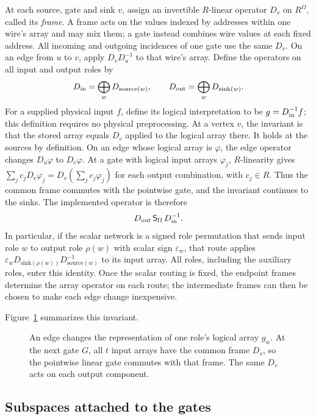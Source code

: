At each source, gate and sink $v$, assign an invertible $R$-linear operator
$D_v$ on $R^\Omega$, called its \emph{frame}.  A frame acts on the values
indexed by addresses within one wire's array and may mix them; a gate instead
combines wire values at each fixed address.  All incoming and outgoing
incidences of one gate use the same $D_v$.  On an edge from $u$ to $v$, apply
$D_vD_u^{-1}$ to that wire's array.  Define the operators on all input and
output roles by
\[
 D_{\rm in}=\bigoplus_w D_{\mathrm{source}(w)},\qquad
 D_{\rm out}=\bigoplus_w D_{\mathrm{sink}(w)}.
\]
For a supplied physical input $f$, define its logical interpretation to be
$g=D_{\rm in}^{-1}f$; this definition requires no physical preprocessing.
At a vertex $v$, the invariant is that the stored array equals $D_v$ applied
to the logical array there.  It holds at the sources by definition.  On an
edge whose logical array is $\varphi$, the edge operator changes $D_u\varphi$
to $D_v\varphi$.  At a gate with logical input arrays $\varphi_j$,
$R$-linearity gives
$\sum_j c_jD_v\varphi_j=D_v(\sum_j c_j\varphi_j)$ for each output combination, with
$c_j\in R$.  Thus the common frame commutes with the pointwise gate, and
the invariant continues to the sinks.  The implemented operator is therefore
\begin{equation}
 D_{\rm out}\,\mathsf S_\Omega\,D_{\rm in}^{-1}.
 \label{eq:common-frame-identity}
\end{equation}
In particular, if the scalar network is a signed role permutation that
sends input role $w$ to output role $\rho(w)$ with scalar sign
$\varepsilon_w$, that route applies
$\varepsilon_wD_{\mathrm{sink}(\rho(w))}
D_{\mathrm{source}(w)}^{-1}$ to its input array.  All roles, including
the auxiliary roles, enter this identity.  Once the scalar routing is fixed,
the endpoint frames determine the array operator on each route; the
intermediate frames can then be chosen to make each edge change inexpensive.

Figure~\ref{fig:frame-compatibility} summarizes this invariant.
\begin{figure}[ht]
\centering

\caption{An edge changes the representation of one role's logical array
$g_w$. At the next gate $G$, all $t$ input arrays have the common frame
$D_v$, so the pointwise linear gate commutes with that frame. The same
$D_v$ acts on each output component.}
\label{fig:frame-compatibility}
\end{figure}

\subsection{Subspaces attached to the gates}

